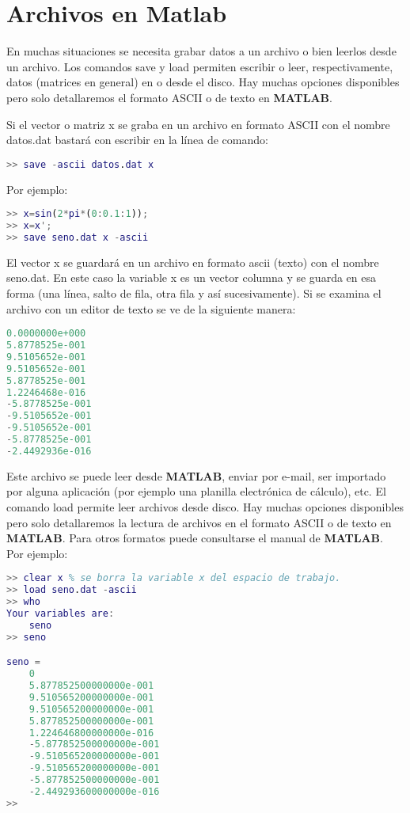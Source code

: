\chapter{Archivos en Matlab}

En muchas situaciones se necesita grabar datos a un archivo o bien leerlos desde un archivo. Los comandos save y load permiten escribir o leer, respectivamente, datos (matrices en general) en o desde el disco. Hay muchas opciones disponibles pero solo detallaremos el formato ASCII o de texto en \textbf{MATLAB}.

Si el vector o matriz x se graba en un archivo en formato ASCII con el nombre datos.dat bastará con escribir en la línea de comando:
\begin{lstlisting}[language=Matlab]
>> save -ascii datos.dat x
\end{lstlisting}

Por ejemplo:
\begin{lstlisting}[language=Matlab]
>> x=sin(2*pi*(0:0.1:1));
>> x=x';
>> save seno.dat x -ascii
\end{lstlisting}

El vector x se guardará en un archivo en formato ascii (texto) con el nombre seno.dat. En este caso la variable x es un vector columna y se guarda en esa forma (una línea, salto de fila, otra fila y así sucesivamente). Si se examina el archivo con un editor de texto se ve de la siguiente manera:
\begin{lstlisting}[language=Matlab]
0.0000000e+000
5.8778525e-001
9.5105652e-001
9.5105652e-001
5.8778525e-001
1.2246468e-016
-5.8778525e-001
-9.5105652e-001
-9.5105652e-001
-5.8778525e-001
-2.4492936e-016
\end{lstlisting}

Este archivo se puede leer desde \textbf{MATLAB}, enviar por e-mail, ser importado por alguna aplicación (por ejemplo una planilla electrónica de cálculo), etc. El comando load permite leer archivos desde disco. Hay muchas opciones disponibles pero solo detallaremos la lectura de archivos en el formato ASCII o de texto en \textbf{MATLAB}. Para otros formatos puede consultarse el manual de \textbf{MATLAB}.\\
Por ejemplo:
\begin{lstlisting}[language=Matlab]
>> clear x % se borra la variable x del espacio de trabajo.
>> load seno.dat -ascii
>> who
Your variables are:
	seno
>> seno

seno =
	0
	5.877852500000000e-001
	9.510565200000000e-001
	9.510565200000000e-001
	5.877852500000000e-001
	1.224646800000000e-016
	-5.877852500000000e-001
	-9.510565200000000e-001
	-9.510565200000000e-001
	-5.877852500000000e-001
	-2.449293600000000e-016
>>

\end{lstlisting}

